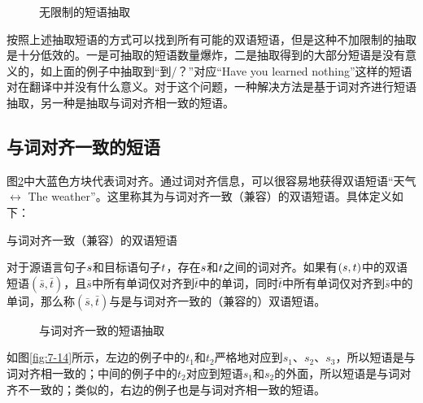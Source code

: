 \begin{figure}[htp]
\centering

\caption{无限制的短语抽取}
\label{fig:7-12}
\end{figure}

\parinterval 按照上述抽取短语的方式可以找到所有可能的双语短语，但是这种不加限制的抽取是十分低效的。一是可抽取的短语数量爆炸，二是抽取得到的大部分短语是没有意义的，如上面的例子中抽取到“到/？”对应“Have you learned nothing”这样的短语对在翻译中并没有什么意义。对于这个问题，一种解决方法是基于词对齐进行短语抽取，另一种是抽取与词对齐相一致的短语。


\subsection{与词对齐一致的短语}

\parinterval 图\ref{fig:7-13}中大蓝色方块代表词对齐。通过词对齐信息，可以很容易地获得双语短语“天气 $\leftrightarrow$ The weather”。这里称其为与词对齐一致（兼容）的双语短语。具体定义如下：

\vspace{0.5em}
\begin{definition} 与词对齐一致（兼容）的双语短语

{\small
对于源语言句子${s}$和目标语句子${t}$，存在${s}$和${t}$之间的词对齐。如果有$({s},{t})$中的双语短语$(\bar{s},\bar{t})$，且$\bar{s}$中所有单词仅对齐到$\bar{t}$中的单词，同时$\bar{t}$中所有单词仅对齐到$\bar{s}$中的单词，那么称$(\bar{s},\bar{t})$与是与词对齐一致的（兼容的）双语短语。
}
\end{definition}

\begin{figure}[htp]
\centering

\caption{与词对齐一致的短语抽取}
\label{fig:7-13}
\end{figure}

\parinterval 如图\ref{fig:7-14}所示，左边的例子中的$t_1$和$t_2$严格地对应到$s_1$、$s_2$、$s_3$，所以短语是与词对齐相一致的；中间的例子中的$t_2$对应到短语$s_1$和$s_2$的外面，所以短语是与词对齐不一致的；类似的，右边的例子也是与词对齐相一致的短语。

